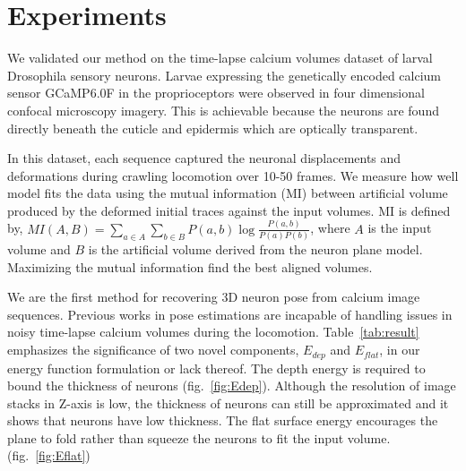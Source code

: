 \documentclass[10pt,letterpaper]{article}
\begin{document}



\section{Experiments}
We validated our method on the time-lapse calcium volumes dataset of larval Drosophila sensory neurons. Larvae expressing the genetically encoded calcium sensor GCaMP6.0F in the proprioceptors were observed in four dimensional confocal microscopy imagery. This is achievable because the neurons are found directly beneath the cuticle and epidermis which are optically transparent.

In this dataset, each sequence captured the neuronal displacements and deformations during crawling locomotion over 10-50 frames. We measure how well model fits the data using the mutual information (MI) \cite{Viola1997} between artificial volume produced by the deformed initial traces against the input volumes. MI is defined by, $MI(A,B) = \sum_{a \in A}\sum_{b \in B} P(a,b) \log \frac{P(a,b)}{P(a)P(b)}$, where $A$ is the input volume and $B$ is the artificial volume derived from the neuron plane model. Maximizing the mutual information find the best aligned volumes.

We are the first method for recovering 3D neuron pose from calcium image sequences. Previous works \cite{Ferrari2009, Glowacki2017} in pose estimations are incapable of handling issues in noisy time-lapse calcium volumes during the locomotion. Table~\ref{tab:result} emphasizes the significance of two novel components, $E_{dep}$ and $E_{flat}$, in our energy function formulation or lack thereof. The depth energy is required to bound the thickness of neurons (fig.~\ref{fig:Edep}). Although the resolution of image stacks in Z-axis is low, the thickness of neurons can still be approximated and it shows that neurons have low thickness. The flat surface energy encourages the plane to fold rather than squeeze the neurons to fit the input volume. (fig.~\ref{fig:Eflat}) 
\end{document}
